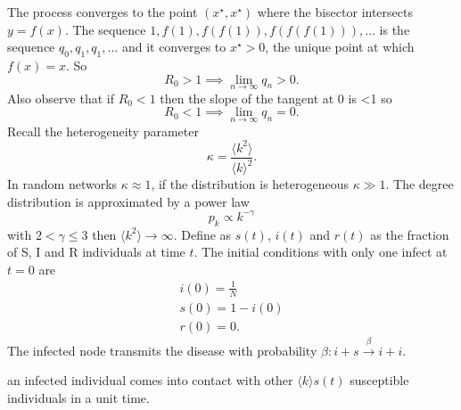 \documentclass[a4paper,9pt]{extarticle}
\begin{document}
\begin{multicols*}{2}
\begin{figure}[H]
		\label{fig:screenshot008}
	\end{figure}
	The process converges to the point $(x^{\star},x^{\star})$ where the bisector intersects $y=f(x)$. The sequence $1,f(1),f(f(1)),f(f(f(1))),\ldots$ is the sequence $q_{0},q_{1},q_{1},\ldots$ and it converges to $x^{\star}>0$, the unique point at which $f(x)=x$. So
	\begin{equation*}
		R_{0}>1\implies\lim_{n\to\infty}q_{n}>0.
	\end{equation*}
	Also observe that if $R_{0}<1$ then the slope of the tangent at 0 is <1 so
	\begin{equation*}
		R_{0}<1\implies\lim_{n\to\infty}q_{n}=0.
	\end{equation*}
	Recall the heterogeneity parameter
	\begin{equation*}
		\kappa=\frac{\langle k^{2}\rangle}{\langle k\rangle^{2}}.
	\end{equation*}
	In random networks $\kappa\approx 1$, if the distribution is heterogeneous $\kappa\gg1$. The degree distribution is approximated by a power law
	\begin{equation*}
		p_{k}\propto k^{-\gamma}
	\end{equation*}
	with $2<\gamma\leq 3$ then $\langle k^{2}\rangle\to\infty$. Define as $s(t)$, $i(t)$ and $r(t)$ as the fraction of S, I and R individuals at time $t$. The initial conditions with only one infect at $t=0$ are
	\begin{equation*}
		\begin{array}{c}
			i(0)=\frac{1}{N}\\
			s(0)=1-i(0)\\
			r(0)=0.
		\end{array}
	\end{equation*}
	The infected node transmits the disease with probability $\beta:i+s\xrightarrow{\beta}i+i$.
	\begin{riquadro}
		an infected individual comes into contact with other $\langle k\rangle s(t)$
		susceptible individuals in a unit time. 
	\end{riquadro}

\end{multicols*}
\end{document}
